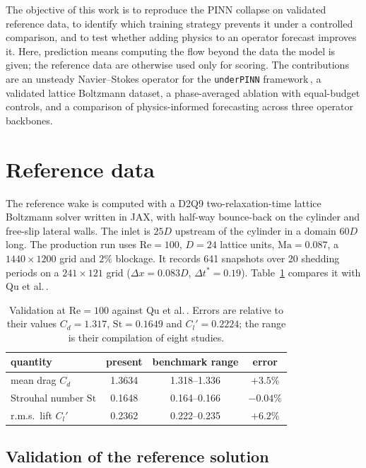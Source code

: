 \documentclass[11pt,a4paper]{article}
\newcommand{\Rey}{\mathrm{Re}}
\newcommand{\St}{\mathrm{St}}
\newcommand{\Cd}{C_d}
\begin{document}
The objective of this work is to reproduce the PINN collapse on validated
reference data, to identify which training strategy prevents it under a
controlled comparison, and to test whether adding physics to an operator
forecast improves it. Here, prediction means computing the flow beyond the
data the model is given; the reference data are otherwise used only for
scoring. The contributions are an unsteady Navier--Stokes operator for the
\texttt{underPINN} framework\,\cite{underpinn}, a validated lattice Boltzmann
dataset, a phase-averaged ablation with equal-budget controls, and a
comparison of physics-informed forecasting across three operator backbones.

\section{Reference data}
\label{sec:lbm}

The reference wake is computed with a D2Q9 two-relaxation-time lattice
Boltzmann solver written in JAX, with half-way bounce-back on the cylinder and
free-slip lateral walls. The inlet is $25D$ upstream of the cylinder in a
domain $60D$ long. The production run uses $\Rey = 100$, $D = 24$ lattice
units, $\mathrm{Ma} = 0.087$, a $1440 \times 1200$ grid and $2\%$ blockage. It
records 641 snapshots over 20 shedding periods on a $241 \times 121$ grid
($\Delta x = 0.083D$, $\Delta t^{*} = 0.19$). Table~\ref{tab:validation}
compares it with Qu et al.\,\cite{qu2013}.

\begin{table}[h]
\centering
\caption{Validation at $\Rey = 100$ against Qu et al.\,\cite{qu2013}. Errors
are relative to their values $\Cd = 1.317$, $\St = 0.1649$ and
$C_l' = 0.2224$; the range is their compilation of eight studies.}
\label{tab:validation}
\begin{tabular}{lccc}
\toprule
quantity & present & benchmark range & error \\
\midrule
mean drag $\Cd$      & 1.3634 & 1.318--1.336 & $+3.5\%$ \\
Strouhal number $\St$ & 0.1648 & 0.164--0.166 & $-0.04\%$ \\
r.m.s.\ lift $C_l'$  & 0.2362 & 0.222--0.235 & $+6.2\%$ \\
\bottomrule
\end{tabular}
\end{table}

\subsection{Validation of the reference solution}
\end{document}
